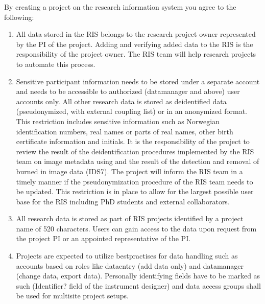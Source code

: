 \documentclass[letterpaper,10pt,english]{sphinxmanual}
\begin{document}
\sphinxAtStartPar
By creating a project on the research information system you agree to the following:
\begin{enumerate}
%
\item {} 
\sphinxAtStartPar
All data stored in the RIS belongs to the research project owner represented by the PI of the project. Adding and verifying added data to the RIS is the responsibility of the project owner. The RIS team will help research projects to automate this process.

\item {} 
\sphinxAtStartPar
Sensitive participant information needs to be stored under a separate account and needs to be accessible to authorized (data\sphinxhyphen{}manager and above) user accounts only. All other research data is stored as de\sphinxhyphen{}identified data (pseudonymized, with external coupling list) or in an anonymized format. This restriction includes sensitive information such as Norwegian identification numbers, real names or parts of real names, other birth certificate information and initials. It is the responsibility of the project to review the result of the de\sphinxhyphen{}identification procedures implemented by the RIS team on image meta\sphinxhyphen{}data using  and the result of the detection and removal of burned in image data (IDS7). The project will inform the RIS team in a timely manner if the pseudonymization procedure of the RIS team needs to be updated. This restriction is in place to allow for the largest possible user base for the RIS including PhD students and external collaborators.

\item {} 
\sphinxAtStartPar
All research data is stored as part of RIS projects identified by a project name  of 5\sphinxhyphen{}20 characters. Users can gain access to the data upon request from the project PI or an appointed representative of the PI.

\item {} 
\sphinxAtStartPar
Projects are expected to utilize best\sphinxhyphen{}practises for data handling such as  accounts based on roles like data\sphinxhyphen{}entry (add data only) and data\sphinxhyphen{}manager (change data, export data). Personally identifying fields have to be marked as such (Identifier? field of the instrument designer) and data access groups shall be used for multi\sphinxhyphen{}site project setups.

\end{enumerate}
\end{document}
